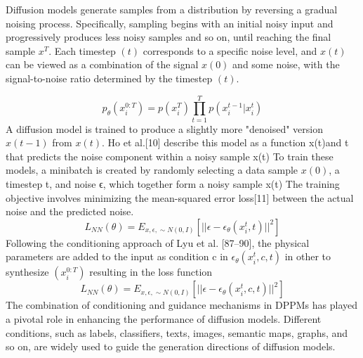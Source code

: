 \documentclass{CUP-JNL-DTM}%
\theoremstyle{definition}
\numberwithin{equation}{section}
\begin{document}
Diffusion models generate samples from a distribution by reversing a gradual noising process. Specifically, sampling begins with an initial noisy input and progressively produces less noisy samples and so on, until reaching the final sample $x^T $.
Each timestep $(t)$ corresponds to a specific noise level, and $x(t)$ can be viewed as a combination of the signal $x(0)$ and some noise, with the signal-to-noise ratio determined by the timestep $(t)$. 

\[
p_{\theta}(x_{i}^{0:T}) =p(x_{i}^{T}) \prod_{t=1}^{T} p(x_{i}^{t-1}|x_{i}^{t})
\]
A diffusion model is trained to produce a slightly more "denoised" version $x(t−1)$ from $x(t)$.  Ho et al.[10]  describe this model as a function x(t)and t that predicts the noise component within a noisy sample x(t) To train these models, a minibatch is created by randomly selecting a data sample $x(0)$, a timestep t, and noise ϵ, which together form a noisy sample x(t) The training objective involves minimizing the mean-squared error loss[11] between the actual noise and the predicted noise. 
\[
 L_{NN}(\theta)=E_{x,\epsilon,\sim N(0,I)}[||\epsilon - \epsilon_{\theta}(x_{i}^t,t)||^2]
\]
Following the conditioning approach of Lyu et al. [87–90], the physical parameters are added to the input as condition c in $\epsilon_{\theta}(x_{i}^t,c,t)$ in other to synthesize $(x_{i}^{0:T})$ resulting in the loss function 
\[
 L_{NN}(\theta)=E_{x,\epsilon,\sim N(0,I)}[||\epsilon - \epsilon_{\theta}(x_{i}^t,c,t)||^2]
\] 
The combination of conditioning and guidance mechanisms in DPPMs has played a pivotal role in enhancing the performance of diffusion models. Different conditions, such as labels, classifiers, texts, images, semantic maps, graphs, and so on, are widely used to guide the generation directions of diffusion models. 
\end{document}
